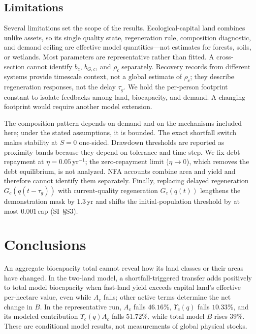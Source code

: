 \documentclass[preprint,12pt,authoryear]{elsarticle}
\newcommand{\Ups}{\Upsilon_c}
\begin{document}
\subsection{Limitations}

Several limitations set the scope of the results. Ecological-capital land combines unlike assets, so its single quality state, regeneration rule, composition diagnostic, and demand ceiling are effective model quantities—not estimates for forests, soils, or wetlands. Most parameters are representative rather than fitted. A cross-section cannot identify $b_c$, $b_{G,c}$, and $\rho_c$ separately. Recovery records from different systems provide timescale context, not a global estimate of $\rho_c$; they describe regeneration responses, not the delay $\tau_g$. We hold the per-person footprint constant to isolate feedbacks among land, biocapacity, and demand. A changing footprint would require another model extension.

The composition pattern depends on demand and on the mechanisms included here; under the stated assumptions, it is bounded. The exact shortfall switch makes stability at $S=0$ one-sided. Drawdown thresholds are reported as proximity bands because they depend on tolerance and time step. We fix debt repayment at $\eta=0.05$\,yr$^{-1}$; the zero-repayment limit ($\eta\to0$), which removes the debt equilibrium, is not analyzed. NFA accounts combine area and yield and therefore cannot identify them separately. Finally, replacing delayed regeneration $G_c(q(t-\tau_g))$ with current-quality regeneration $G_c(q(t))$ lengthens the demonstration mask by $1.3$\,yr and shifts the initial-population threshold by at most $0.001$\,cap (SI~\S S3).

\section{Conclusions}\label{sec:conclusions}

An aggregate biocapacity total cannot reveal how its land classes or their areas have changed. In the two-land model, a shortfall-triggered transfer adds positively to total model biocapacity when fast-land yield exceeds capital land's effective per-hectare value, even while $A_c$ falls; other active terms determine the net change in $B$. In the representative run, $A_c$ falls $46.16\%$, $\Ups(q)$ falls $10.33\%$, and its modeled contribution $\Ups(q)A_c$ falls $51.72\%$, while total model $B$ rises $39\%$. These are conditional model results, not measurements of global physical stocks.
\end{document}
